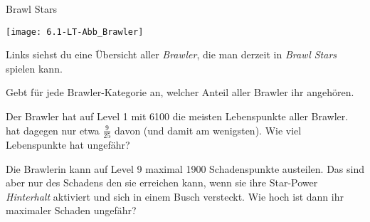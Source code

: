 \documentclass[lerntheke,12pt,a5paper,landscape]{arbeitsblatt}
\begin{document}
	\begin{karte3}[\iconPartner]{Brawl Stars}
		\begin{minipage}{.5\textwidth}
			\texttt{[image: 6.1-LT-Abb\_Brawler]}
		\end{minipage}\hfill\begin{minipage}{.49\textwidth}
			Links siehst du eine Übersicht aller \emph{Brawler}, die man derzeit in \emph{Brawl Stars} spielen kann.

			\begin{smallenum}\small
				\item Gebt für jede Brawler-Kategorie an, welcher Anteil aller Brawler ihr angehören.

				\item Der Brawler  hat auf Level 1 mit \num{6100} die meisten Lebenspunkte aller Brawler.  hat dagegen nur etwa $\tfrac{9}{25}$ davon (und damit am wenigsten). Wie viel Lebenspunkte hat  ungefähr?

				\item Die Brawlerin  kann auf Level 9 maximal \num{1900} Schadenspunkte austeilen. Das sind aber nur  des Schadens den sie erreichen kann, wenn sie ihre Star-Power \emph{Hinterhalt} aktiviert und sich in einem Busch versteckt. Wie hoch ist dann ihr maximaler Schaden ungefähr?
			\end{smallenum}
		\end{minipage}
	\end{karte3}
\end{document}
